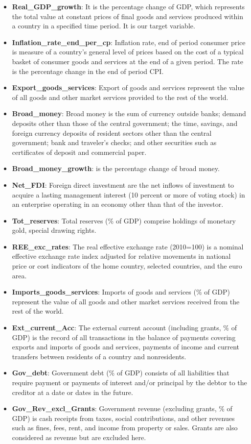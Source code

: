 \documentclass[12pt,italian, twoside]{report}
\begin{document}
\begin{itemize}
	\item \textbf{Real\_GDP\_growth}: It is the percentage change of GDP, which represents the total value at constant prices of final goods and services produced within a country in a specified time period. It is our target variable.
	\item \textbf{Inflation\_rate\_end\_per\_cp}: Inflation rate, end of period consumer price is measure of a country’s general level of prices based on the cost of a typical basket of consumer goods and services at the end of a given period. The rate is the percentage change in the end of period CPI.
	\item \textbf{Export\_goods\_services}: Export of goods and services represent the value of all goods and other market services provided to the rest of the world.
	\item \textbf{Broad\_money}: Broad money is the sum of currency outside banks; demand deposits other than those of the central government; the time, savings, and foreign currency deposits of resident sectors other than the central government; bank and traveler’s checks; and other securities such as certificates of deposit and commercial paper.
	\item \textbf{Broad\_money\_growth}: is the percentage change of broad money.
	\item \textbf{Net\_FDI}: Foreign direct investment are the net inflows of investment to acquire a lasting management interest (10 percent or more of voting stock) in an enterprise operating in an economy other than that of the investor.
	\item \textbf{Tot\_reserves}: Total reserves (\% of GDP) comprise holdings of monetary gold, special drawing rights.
	\item \textbf{REE\_exc\_rates}: The real effective exchange rate (2010=100) is a nominal effective exchange rate index adjusted for relative movements in national price or cost indicators of the home country, selected countries, and the euro area.
	\item \textbf{Imports\_goods\_services}: Imports of goods and services (\% of GDP) represent the value of all goods and other market services received from the rest of the world.
	\item \textbf{Ext\_current\_Acc}: The external current account (including grants, \% of GDP) is the record of all transactions in the balance of payments covering exports and imports of goods and services, payments of income and current transfers between residents of a country and nonresidents.
	\item \textbf{Gov\_debt}: Government debt (\% of GDP) consists of all liabilities that require payment or payments of interest and/or principal by the debtor to the creditor at a date or dates in the future.
	\item \textbf{Gov\_Rev\_excl\_Grants}: Government revenue (excluding grants, \% of GDP) is cash receipts from taxes, social contributions, and other revenues such as fines, fees, rent, and income from property or sales. Grants are also considered as revenue but are excluded here.
\end{itemize}
\end{document}
